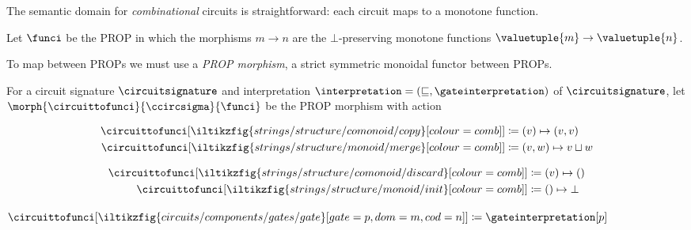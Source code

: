 \documentclass{lmcs}
\begin{document}
The semantic domain for \emph{combinational} circuits is straightforward: each
circuit maps to a monotone function.

\begin{defi}
    Let \(\funci\) be the PROP in which the morphisms
    \(m \to n\) are the \(\bot\)-preserving monotone
    functions \(\valuetuple{m} \to \valuetuple{n}\).
\end{defi}

To map between PROPs we must use a \emph{PROP morphism}, a strict symmetric
monoidal functor between PROPs.

\begin{defi}
    For a circuit signature \(\circuitsignature\) and interpretation
    \(\interpretation = \left(\sqsubseteq, \gateinterpretation\right)\) of
    \(\circuitsignature\), let \(\morph{\circuittofunci}{\ccircsigma}{\funci}\)
    be the PROP morphism with action%
    \vspace{-\abovedisplayskip}
    \begin{center}
        \begin{minipage}{0.32\textwidth}
            \centering
            \begin{align*}
                \circuittofunci[
                    \iltikzfig{strings/structure/comonoid/copy}[colour=comb]
                ]
                 & \coloneqq
                (v) \mapsto (v, v)
                \\
                \circuittofunci[
                    \iltikzfig{strings/structure/monoid/merge}[colour=comb]
                ]
                 & \coloneqq
                (v, w) \mapsto v \sqcup w
            \end{align*}
        \end{minipage}
        \quad
        \begin{minipage}{0.25\textwidth}
            \centering
            \begin{align*}
                \circuittofunci[
                    \iltikzfig{strings/structure/comonoid/discard}[colour=comb]
                ]
                 & \coloneqq
                (v) \mapsto ()
                \\
                \circuittofunci[
                    \iltikzfig{strings/structure/monoid/init}[colour=comb]
                ]
                 & \coloneqq
                () \mapsto \bot
            \end{align*}
        \end{minipage}
        \quad
        \begin{minipage}{0.25\textwidth}
            \centering
            \vspace{1.5em}
            \(\circuittofunci[
                \iltikzfig{circuits/components/gates/gate}[gate=p,dom=m,cod=n]
            ]
            \coloneqq
            \gateinterpretation[p]
            \)
        \end{minipage}
    \end{center}
\end{defi}
\end{document}
